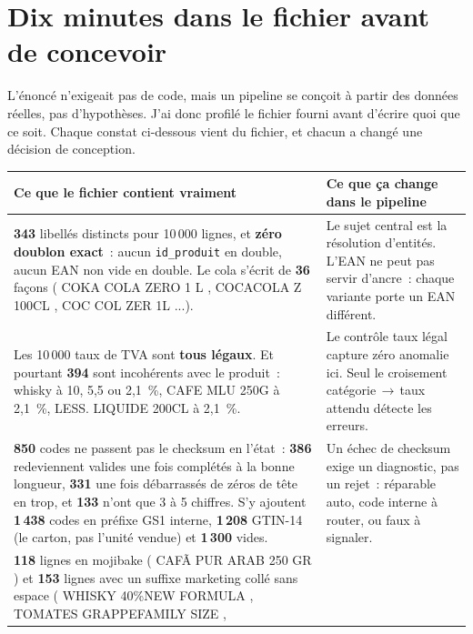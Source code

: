 \documentclass[11pt,a4paper]{article}
\begin{document}
\section*{Dix minutes dans le fichier avant de concevoir}

L'énoncé n'exigeait pas de code, mais un pipeline se conçoit à partir des données réelles, pas
d'hypothèses. J'ai donc profilé le fichier fourni avant d'écrire quoi que ce
soit. Chaque constat ci-dessous vient du fichier, et chacun a changé une décision de conception.

\renewcommand{\arraystretch}{1.3}
\begin{tabularx}{\linewidth}{L{7.9cm} X}
\toprule
\textbf{Ce que le fichier contient vraiment} & \textbf{Ce que ça change dans le pipeline} \\
\midrule
\textbf{343} libellés distincts pour 10\,000 lignes, et \textbf{zéro doublon exact}~: aucun
\texttt{id\_produit} en double, aucun EAN non vide en double. Le cola s'écrit de \textbf{36}
façons (\guillemotleft{} COKA COLA ZERO 1 L \guillemotright{}, \guillemotleft{} COCACOLA Z 100CL \guillemotright{}, \guillemotleft{} COC COL ZER 1L \guillemotright{}...). &
Le sujet central est la résolution d'entités. L'EAN ne peut pas servir d'ancre~: chaque variante
porte un EAN différent. \\
\addlinespace
Les 10\,000 taux de TVA sont \textbf{tous légaux}. Et pourtant \textbf{394} sont incohérents avec
le produit~: whisky à 10, 5,5 ou 2,1~\%, \guillemotleft{} CAFE MLU 250G \guillemotright{} à 2,1~\%, \guillemotleft{} LESS. LIQUIDE 200CL \guillemotright{} à
2,1~\%. &
Le contrôle \guillemotleft{} taux légal \guillemotright{} capture zéro anomalie ici. Seul le croisement
catégorie\,$\to$\,taux attendu détecte les erreurs. \\
\addlinespace
\textbf{850} codes ne passent pas le checksum en l'état~: \textbf{386} redeviennent valides une
fois complétés à la bonne longueur, \textbf{331} une fois débarrassés de zéros de tête en trop,
et \textbf{133} n'ont que 3 à 5 chiffres. S'y ajoutent \textbf{1\,438} codes en préfixe GS1
interne, \textbf{1\,208} GTIN-14 (le carton, pas l'unité vendue) et \textbf{1\,300} vides. &
Un échec de checksum exige un diagnostic, pas un rejet~: réparable auto, code interne à router,
ou faux à signaler. \\
\addlinespace
\textbf{118} lignes en mojibake (\guillemotleft{} CAFÃ\textperthousand{} PUR ARAB 250 GR \guillemotright{}) et \textbf{153} lignes avec un
suffixe marketing collé sans espace (\guillemotleft{} WHISKY 40\%NEW FORMULA \guillemotright{}, \guillemotleft{} TOMATES GRAPPEFAMILY SIZE \guillemotright{},

\end{tabularx}
\end{document}
